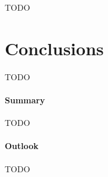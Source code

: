 \documentclass{PDS}
\begin{document}
TODO

\section{Conclusions}
\label{sec:conclusion}

TODO

\paragraph{Summary}

TODO

\paragraph{Outlook}

TODO

\begin{Backmatter}




\end{Backmatter}
\end{document}
